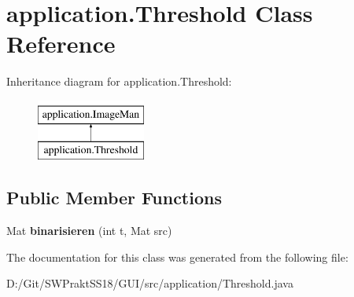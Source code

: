 \hypertarget{classapplication_1_1_threshold}{}\section{application.\+Threshold Class Reference}
\label{classapplication_1_1_threshold}
Inheritance diagram for application.\+Threshold\+:\begin{figure}[H]
\begin{center}
\leavevmode
\includegraphics[height=2.000000cm]{classapplication_1_1_threshold}
\end{center}
\end{figure}
\subsection*{Public Member Functions}
\begin{DoxyCompactItemize}
\item 
\mbox{\label{classapplication_1_1_threshold_a3711413d5eb746e666aef1ea102b111b}} 
Mat {\bfseries binarisieren} (int t, Mat src)
\end{DoxyCompactItemize}


The documentation for this class was generated from the following file\+:\begin{DoxyCompactItemize}
\item 
D\+:/\+Git/\+S\+W\+Prakt\+S\+S18/\+G\+U\+I/src/application/Threshold.\+java\end{DoxyCompactItemize}
